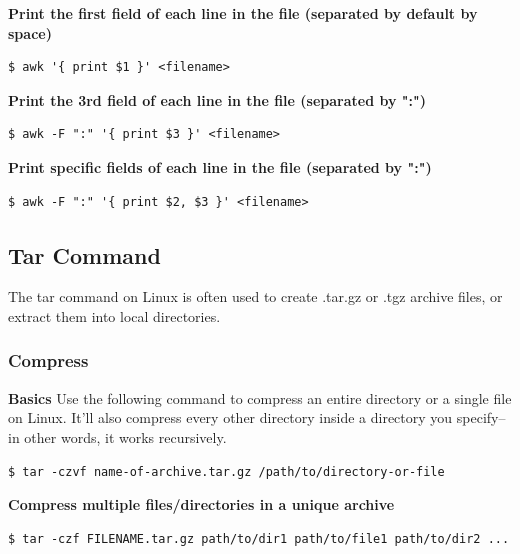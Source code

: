 \documentclass{article}
\newenvironment{codetemplate}[1][]{%
  \mybasecolorbox[#1]
  \itshape
}{%
  \endmybasecolorbox
}
\begin{document}
\textbf{Print the first field of each line in the file (separated by default by space)}
\begin{codetemplate}{}
\begin{verbatim}
$ awk '{ print $1 }' <filename>
\end{verbatim}
\end{codetemplate}

\textbf{Print the 3rd field of each line in the file (separated by ":")}
\begin{codetemplate}{}
\begin{verbatim}
$ awk -F ":" '{ print $3 }' <filename>
\end{verbatim}
\end{codetemplate}

\textbf{Print specific fields of each line in the file (separated by ":")}
\begin{codetemplate}{}
\begin{verbatim}
$ awk -F ":" '{ print $2, $3 }' <filename>
\end{verbatim}
\end{codetemplate}

\subsection{Tar Command}
The tar command on Linux is often used to create .tar.gz or .tgz archive files, or extract them into local directories.
\subsubsection{Compress}
\textbf{Basics}
\newline
Use the following command to compress an entire directory or a single file on Linux. It’ll also compress every other directory inside a directory you specify–in other words, it works recursively.
\begin{codetemplate}{}
\begin{verbatim}
$ tar -czvf name-of-archive.tar.gz /path/to/directory-or-file
\end{verbatim}
\end{codetemplate}

\textbf{Compress multiple files/directories in a unique archive}
\begin{codetemplate}{}
\begin{verbatim}
$ tar -czf FILENAME.tar.gz path/to/dir1 path/to/file1 path/to/dir2 ...
\end{verbatim}
\end{codetemplate}
\end{document}

